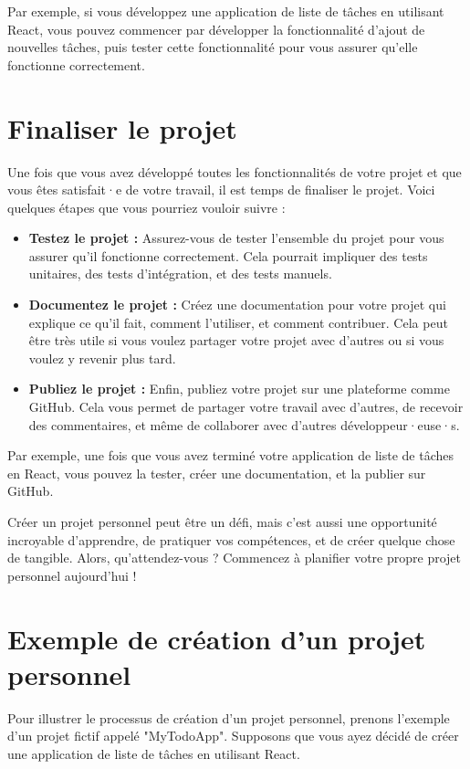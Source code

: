 Par exemple, si vous développez une application de liste de tâches en utilisant React, vous pouvez commencer par développer la fonctionnalité d'ajout de nouvelles tâches, puis tester cette fonctionnalité pour vous assurer qu'elle fonctionne correctement.

\section{Finaliser le projet}

Une fois que vous avez développé toutes les fonctionnalités de votre projet et que vous êtes satisfait·e de votre travail, il est temps de finaliser le projet. Voici quelques étapes que vous pourriez vouloir suivre :

\begin{itemize}
    \item \textbf{Testez le projet :} Assurez-vous de tester l'ensemble du projet pour vous assurer qu'il fonctionne correctement. Cela pourrait impliquer des tests unitaires, des tests d'intégration, et des tests manuels.
    \item \textbf{Documentez le projet :} Créez une documentation pour votre projet qui explique ce qu'il fait, comment l'utiliser, et comment contribuer. Cela peut être très utile si vous voulez partager votre projet avec d'autres ou si vous voulez y revenir plus tard.
    \item \textbf{Publiez le projet :} Enfin, publiez votre projet sur une plateforme comme GitHub. Cela vous permet de partager votre travail avec d'autres, de recevoir des commentaires, et même de collaborer avec d'autres développeur·euse·s.
\end{itemize}

Par exemple, une fois que vous avez terminé votre application de liste de tâches en React, vous pouvez la tester, créer une documentation, et la publier sur GitHub.

Créer un projet personnel peut être un défi, mais c'est aussi une opportunité incroyable d'apprendre, de pratiquer vos compétences, et de créer quelque chose de tangible. Alors, qu'attendez-vous ? Commencez à planifier votre propre projet personnel aujourd'hui !

\section{Exemple de création d'un projet personnel}

Pour illustrer le processus de création d'un projet personnel, prenons l'exemple d'un projet fictif appelé "MyTodoApp". Supposons que vous ayez décidé de créer une application de liste de tâches en utilisant React.

